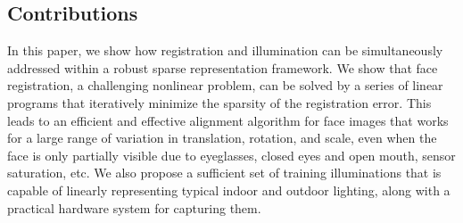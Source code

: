 \documentclass[12pt,journal,draftcls,letterpaper,onecolumn]{IEEEtran}
\begin{document}
\subsection{Contributions} In this paper, we show how 
registration and illumination
can be simultaneously addressed within a robust sparse representation
framework. We show that face registration, a challenging
nonlinear problem, can be solved by a series of linear programs
that iteratively minimize the sparsity of the registration
error. This leads to an efficient and effective alignment
algorithm for face images that works for a large range of
variation in translation, rotation, and scale, even when
the face is only partially visible due to eyeglasses, closed
eyes and open mouth, sensor saturation, etc.  We also propose a
sufficient set of training illuminations
that is capable of linearly representing typical indoor and outdoor
lighting, along with a practical hardware system for capturing
them.




\end{document}
